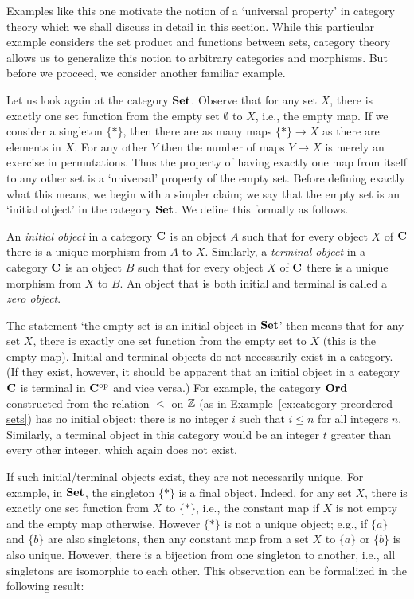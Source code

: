 Examples like this one motivate the notion of a `universal property' in category
theory which we shall discuss in detail in this section. While this particular
example considers the set product and functions between sets, category theory
allows us to generalize this notion to arbitrary categories and morphisms. But
before we proceed, we consider another familiar example.

Let us look again at the category \(\mathbf{Set}\). Observe that for any set \(X\),
there is exactly one set function from the empty set \(\emptyset\) to \(X\),
i.e., the empty map. If we consider a singleton \(\{*\}\), then there are as
many maps \(\{*\} \to X\) as there are elements in \(X\). For any other \(Y\)
then the number of maps \(Y \to X\) is merely an exercise in permutations. Thus
the property of having exactly one map from itself to any other set is a
`universal' property of the empty set. Before defining exactly what this means,
we begin with a simpler claim; we say that the empty set is an `initial object'
in the category \(\mathbf{Set}\). We define this formally as follows.

\begin{definition}
    An \emph{initial object} in a category \(\mathbf{C}\) is an object \(A\) such
    that for every object \(X\) of \(\mathbf{C}\) there is a unique morphism from
    \(A\) to \(X\). Similarly, a \emph{terminal object} in a category
    \(\mathbf{C}\) is an object \(B\) such that for every object \(X\) of
    \(\mathbf{C}\) there is a unique morphism from \(X\) to \(B\). An object that
    is both initial and terminal is called a \emph{zero object}.
\end{definition}

The statement `the empty set is an initial object in \({\mathbf{Set}}\)' then means that
for any set \(X\), there is exactly one set function from the empty set to \(X\)
(this is the empty map). Initial and terminal objects do not necessarily exist
in a category. (If they exist, however, it should be apparent that an initial
object in a category \(\mathbf{C}\) is terminal in \(\mathbf{C}^{\mathrm{op}}\) and vice
versa.) For example, the category \(\mathbf{Ord}\) constructed from the relation
\(\leq\) on \(\mathbb{Z}\) (as in Example~\ref{ex:category-preordered-sets}) has no
initial object: there is no integer \(i\) such that \(i \leq n\) for all
integers \(n\). Similarly, a terminal object in this category would be an
integer \(t\) greater than every other integer, which again does not exist.

If such initial/terminal objects exist, they are not necessarily unique. For
example, in \(\mathbf{Set}\), the singleton \(\{*\}\) is a final object. Indeed, for any
set \(X\), there is exactly one set function from \(X\) to \(\{*\}\), i.e., the
constant map if \(X\) is not empty and the empty map otherwise. However
\(\{*\}\) is not a unique object; e.g., if \(\{a\}\) and \(\{b\}\) are also
singletons, then any constant map from a set \(X\) to \(\{a\}\) or \(\{b\}\) is
also unique. However, there is a bijection from one singleton to another, i.e.,
all singletons are isomorphic to each other. This observation can be formalized
in the following result:

